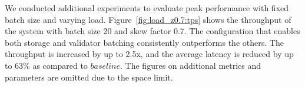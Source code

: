 We conducted additional experiments to evaluate peak performance with fixed batch size and varying load. Figure~\ref{fig:load_z0.7:tps} shows the throughput of the system with batch size 20 and skew factor 0.7. The configuration that enables both storage and validator batching consistently outperforms the others. The throughput is increased by up to 2.5x, and the average latency is reduced by up to 63\% as compared to $baseline$. The figures on additional metrics and parameters are omitted due to the space limit.


